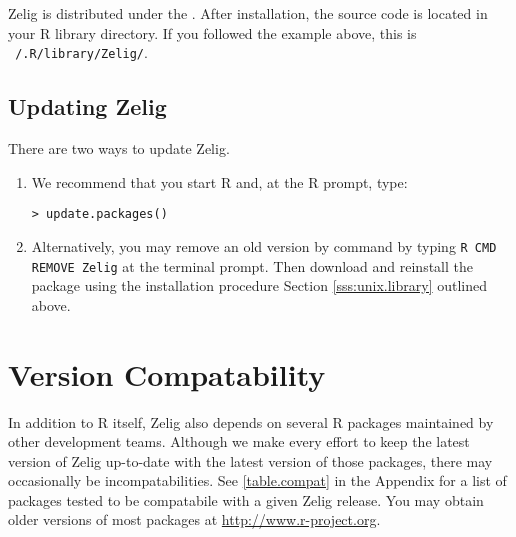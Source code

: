 \documentclass{article}
\begin{document}
Zelig is distributed under the .  After
installation, the source code is located in your R library directory.
If you followed the example above, this is {\tt ~/.R/library/Zelig/}.

\subsection{Updating Zelig} \label{sss:unix.updating}

There are two ways to update Zelig.  

\begin{enumerate}

\item We recommend that you start R and, at the R prompt, type:
\begin{verbatim}
> update.packages()
\end{verbatim}
  
\item Alternatively, you may remove an old version by command by
  typing {\tt R CMD REMOVE Zelig} at the terminal prompt.  Then
  download and reinstall the package using the installation
  procedure Section \ref{sss:unix.library} outlined above.

\end{enumerate}

\section{Version Compatability}

In addition to R itself, Zelig also depends on several R packages
maintained by other development teams.  Although we make every effort
to keep the latest version of Zelig up-to-date with the latest version
of those packages, there may occasionally be incompatabilities.  See
\ref{table.compat} in the Appendix for a list of packages tested to be
compatabile with a given Zelig release.  You may obtain older versions
of most packages at \url{http://www.r-project.org}.  

\end{document}

